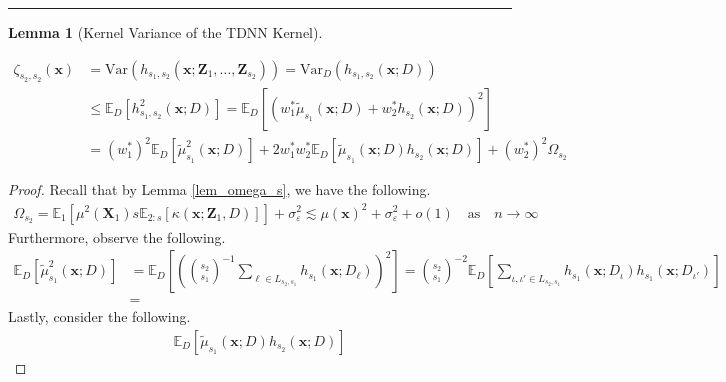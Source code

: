 \documentclass[letterpaper,10pt]{article}
\numberwithin{equation}{section}
\numberwithin{thm}{section}
\newtheorem{lem}{Lemma}
\numberwithin{lem}{section}
\numberwithin{cor}{section}
\newcommand{\E}{\mathbb{E}}
\newcommand{\1}{\mathbbm{1}}
\newcommand{\Var}{\text{Var}}
\begin{document}
\hrule

\begin{lem}[Kernel Variance of the TDNN Kernel]\label{Var_TDNN_k}

\end{lem}

\begin{equation}
	\begin{aligned}
		\zeta_{s_2, s_2}\left(\mathbf{x}\right)
		 & = \Var\left(h_{s_1, s_2}\left(\mathbf{x}; \mathbf{Z}_1, \ldots, \mathbf{Z}_{s_2}\right)\right)
		= \Var_{D}\left(h_{s_1, s_2}\left(\mathbf{x}; D\right)\right)                                     \\
		 & \leq \E_{D}\left[h_{s_1, s_2}^{2}\left(\mathbf{x}; D\right)\right]
		= \E_{D}\left[
			\left(w_{1}^{*}\tilde{\mu}_{s_1}\left(\mathbf{x}; D\right) + w_{2}^{*} h_{s_2}\left(\mathbf{x}; D\right)\right)^2
		\right]                                                                                           \\
		 & = \left(w_{1}^{*}\right)^2\E_{D}\left[\tilde{\mu}_{s_1}^{2}\left(\mathbf{x}; D\right)\right]
		+ 2 w_{1}^{*}w_{2}^{*} \E_{D}\left[\tilde{\mu}_{s_1}\left(\mathbf{x}; D\right) h_{s_2}\left(\mathbf{x}; D\right)\right]
		+ \left(w_{2}^{*}\right)^2\Omega_{s_2}
	\end{aligned}
\end{equation}

\begin{proof}
	Recall that by Lemma \ref{lem_omega_s}, we have the following.
	\begin{equation}
		\begin{aligned}
			\Omega_{s_2}
			= \E_1\left[\mu^2\left(\mathbf{X}_1\right) s \E_{2:s}\left[\kappa\left(\mathbf{x}; \mathbf{Z}_1, D\right)\right]\right] + \sigma_{\varepsilon}^2
			\lesssim \mu(\mathbf{x})^2 + \sigma_{\varepsilon}^2 + o(1)
			\quad \text{as} \quad n \rightarrow \infty
		\end{aligned}
	\end{equation}
	Furthermore, observe the following.
	\begin{equation}
		\begin{aligned}
			\E_{D}\left[\tilde{\mu}_{s_1}^{2}\left(\mathbf{x}; D\right)\right]
			 & = \E_D\left[\left(\binom{s_2}{s_1}^{-1}\sum_{\ell \in L_{s_2, s_1}} h_{s_1}\left(\mathbf{x}; D_{\ell}\right)\right)^2\right]
			= \binom{s_2}{s_1}^{-2} \E_{D}\left[\sum_{\iota, \iota' \in L_{s_2, s_1}}h_{s_1}\left(\mathbf{x}; D_{\iota}\right)h_{s_1}\left(\mathbf{x}; D_{\iota'}\right)\right] \\
			 & =
		\end{aligned}
	\end{equation}
	Lastly, consider the following.
	\begin{equation}
		\begin{aligned}
			\E_{D}\left[\tilde{\mu}_{s_1}\left(\mathbf{x}; D\right) h_{s_2}\left(\mathbf{x}; D\right)\right]
		\end{aligned}
	\end{equation}
\end{proof}
\end{document}
